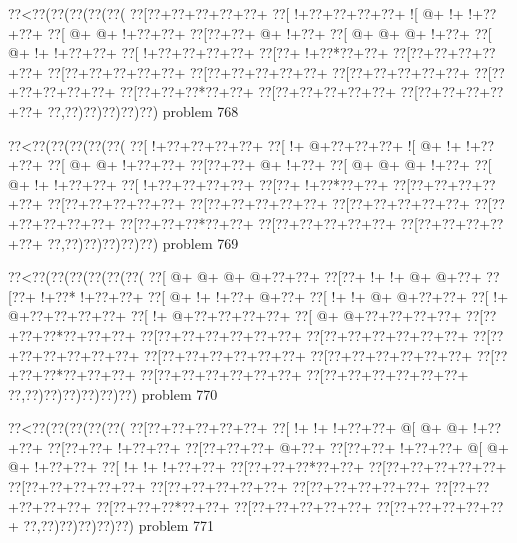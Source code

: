 \vbox{\vbox{\goo
\0??<\0??(\0??(\0??(\0??(\0??(
\0??[\0??+\0??+\0??+\0??+\0??+
\0??[\- !+\0??+\0??+\0??+\0??+
\- ![\- @+\- !+\- !+\0??+\0??+
\0??[\- @+\- @+\- !+\0??+\0??+
\0??[\0??+\0??+\- @+\- !+\0??+
\0??[\- @+\- @+\- @+\- !+\0??+
\0??[\- @+\- !+\- !+\0??+\0??+
\0??[\- !+\0??+\0??+\0??+\0??+
\0??[\0??+\- !+\0??*\0??+\0??+
\0??[\0??+\0??+\0??+\0??+\0??+
\0??[\0??+\0??+\0??+\0??+\0??+
\0??[\0??+\0??+\0??+\0??+\0??+
\0??[\0??+\0??+\0??+\0??+\0??+
\0??[\0??+\0??+\0??+\0??+\0??+
\0??[\0??+\0??+\0??*\0??+\0??+
\0??[\0??+\0??+\0??+\0??+\0??+
\0??[\0??+\0??+\0??+\0??+\0??+
\0??,\0??)\0??)\0??)\0??)\0??)
}
\hfil problem 768\hfil\break
}

\vbox{\vbox{\goo
\0??<\0??(\0??(\0??(\0??(\0??(
\0??[\- !+\0??+\0??+\0??+\0??+
\0??[\- !+\- @+\0??+\0??+\0??+
\- ![\- @+\- !+\- !+\0??+\0??+
\0??[\- @+\- @+\- !+\0??+\0??+
\0??[\0??+\0??+\- @+\- !+\0??+
\0??[\- @+\- @+\- @+\- !+\0??+
\0??[\- @+\- !+\- !+\0??+\0??+
\0??[\- !+\0??+\0??+\0??+\0??+
\0??[\0??+\- !+\0??*\0??+\0??+
\0??[\0??+\0??+\0??+\0??+\0??+
\0??[\0??+\0??+\0??+\0??+\0??+
\0??[\0??+\0??+\0??+\0??+\0??+
\0??[\0??+\0??+\0??+\0??+\0??+
\0??[\0??+\0??+\0??+\0??+\0??+
\0??[\0??+\0??+\0??*\0??+\0??+
\0??[\0??+\0??+\0??+\0??+\0??+
\0??[\0??+\0??+\0??+\0??+\0??+
\0??,\0??)\0??)\0??)\0??)\0??)
}
\hfil problem 769\hfil\break
}

\vbox{\vbox{\goo
\0??<\0??(\0??(\0??(\0??(\0??(\0??(
\0??[\- @+\- @+\- @+\- @+\0??+\0??+
\0??[\0??+\- !+\- !+\- @+\- @+\0??+
\0??[\0??+\- !+\0??*\- !+\0??+\0??+
\0??[\- @+\- !+\- !+\0??+\- @+\0??+
\0??[\- !+\- !+\- @+\- @+\0??+\0??+
\0??[\- !+\- @+\0??+\0??+\0??+\0??+
\0??[\- !+\- @+\0??+\0??+\0??+\0??+
\0??[\- @+\- @+\0??+\0??+\0??+\0??+
\0??[\0??+\0??+\0??*\0??+\0??+\0??+
\0??[\0??+\0??+\0??+\0??+\0??+\0??+
\0??[\0??+\0??+\0??+\0??+\0??+\0??+
\0??[\0??+\0??+\0??+\0??+\0??+\0??+
\0??[\0??+\0??+\0??+\0??+\0??+\0??+
\0??[\0??+\0??+\0??+\0??+\0??+\0??+
\0??[\0??+\0??+\0??*\0??+\0??+\0??+
\0??[\0??+\0??+\0??+\0??+\0??+\0??+
\0??[\0??+\0??+\0??+\0??+\0??+\0??+
\0??,\0??)\0??)\0??)\0??)\0??)\0??)
}
\hfil problem 770\hfil\break
}

\vbox{\vbox{\goo
\0??<\0??(\0??(\0??(\0??(\0??(
\0??[\0??+\0??+\0??+\0??+\0??+
\0??[\- !+\- !+\- !+\0??+\0??+
\- @[\- @+\- @+\- !+\0??+\0??+
\0??[\0??+\0??+\- !+\0??+\0??+
\0??[\0??+\0??+\0??+\- @+\0??+
\0??[\0??+\0??+\- !+\0??+\0??+
\- @[\- @+\- @+\- !+\0??+\0??+
\0??[\- !+\- !+\- !+\0??+\0??+
\0??[\0??+\0??+\0??*\0??+\0??+
\0??[\0??+\0??+\0??+\0??+\0??+
\0??[\0??+\0??+\0??+\0??+\0??+
\0??[\0??+\0??+\0??+\0??+\0??+
\0??[\0??+\0??+\0??+\0??+\0??+
\0??[\0??+\0??+\0??+\0??+\0??+
\0??[\0??+\0??+\0??*\0??+\0??+
\0??[\0??+\0??+\0??+\0??+\0??+
\0??[\0??+\0??+\0??+\0??+\0??+
\0??,\0??)\0??)\0??)\0??)\0??)
}
\hfil problem 771\hfil\break
}

